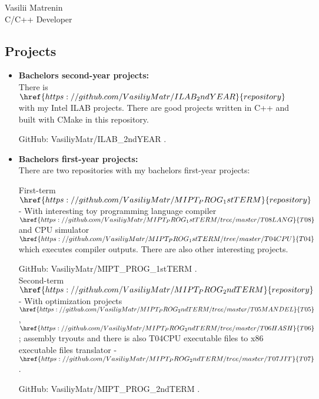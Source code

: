 
\begin{center}
    \Huge
    Vasilii Matrenin \\
    \Large
    C/C++ Developer
\end{center}

\vspace* {0.6cm}

\begin{minipage}[t]{12cm}

\subsection* {Projects}
\begin{itemize}

\item \textbf {Bachelors second-year projects:} \\ [0.1cm]
    There is $\href {https://github.com/VasiliyMatr/ILAB_2ndYEAR}{repository}$
    with my Intel ILAB projects. There are good projects written in C++ and built with
    CMake in this repository.

    GitHub: VasiliyMatr/ILAB\_2ndYEAR .

\item \textbf {Bachelors first-year projects:} \\ [0.1cm]
    There are two repositories with my bachelors first-year projects:

    First-term $\href {https://github.com/VasiliyMatr/MIPT_PROG_1stTERM}{repository}$
    - With interesting toy programming language compiler
    $\href {https://github.com/VasiliyMatr/MIPT_PROG_1stTERM/tree/master/T08LANG}{T08}$
    and CPU simulator
    $\href {https://github.com/VasiliyMatr/MIPT_PROG_1stTERM/tree/master/T04CPU}{T04}$
    which executes compiler outputs. There are also other interesting projects.

    GitHub: VasiliyMatr/MIPT\_PROG\_1stTERM . \\ [0.1cm]

    Second-term $\href {https://github.com/VasiliyMatr/MIPT_PROG_2ndTERM}{repository}$
    - With optimization projects
    $\href {https://github.com/VasiliyMatr/MIPT_PROG_2ndTERM/tree/master/T05MANDEL}{T05}$ ,
    $\href {https://github.com/VasiliyMatr/MIPT_PROG_2ndTERM/tree/master/T06HASH}{T06}$;
    assembly tryouts and there is also T04CPU executable files to x86 executable files translator -
    $\href {https://github.com/VasiliyMatr/MIPT_PROG_2ndTERM/tree/master/T07JIT}{T07}$.

    GitHub: VasiliyMatr/MIPT\_PROG\_2ndTERM .

\end{itemize}

\end{minipage}
